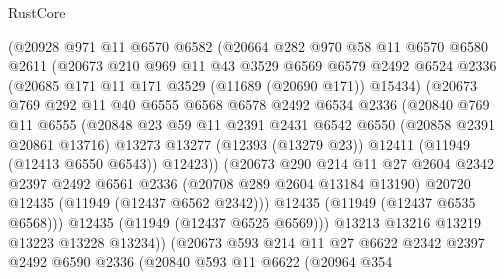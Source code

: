 \begin{lexlean}{RustCore}
\begin{coremodule}
            (@20928
              @971
              @11
              @6570
              @6582
              (@20664
                @282
                @970
                @58
                @11
                @6570
                @6580
                @2611
                (@20673
                  @210
                  @969
                  @11
                  @43
                  @3529
                  @6569
                  @6579
                  @2492
                  @6524
                  @2336
                  (@20685 @171 @11 @171 @3529 (@11689 (@20690 @171)) @15434)
                  (@20673
                    @769
                    @292
                    @11
                    @40
                    @6555
                    @6568
                    @6578
                    @2492
                    @6534
                    @2336
                    (@20840
                      @769
                      @11
                      @6555
                      (@20848
                        @23
                        @59
                        @11
                        @2391
                        @2431
                        @6542
                        @6550
                        (@20858 @2391 @20861 @13716)
                        @13273
                        @13277
                        (@12393 (@13279 @23))
                        @12411
                        (@11949 (@12413 @6550 @6543))
                        @12423))
                    (@20673
                      @290
                      @214
                      @11
                      @27
                      @2604
                      @2342
                      @2397
                      @2492
                      @6561
                      @2336
                      (@20708 @289 @2604 @13184 @13190)
                      @20720
                      @12435
                      (@11949 (@12437 @6562 @2342)))
                    @12435
                    (@11949 (@12437 @6535 @6568)))
                  @12435
                  (@11949 (@12437 @6525 @6569)))
                @13213
                @13216
                @13219
                @13223
                @13228
                @13234))
            (@20673
              @593
              @214
              @11
              @27
              @6622
              @2342
              @2397
              @2492
              @6590
              @2336
              (@20840
                @593
                @11
                @6622
                (@20964
                  @354

\end{coremodule}
\end{lexlean}
